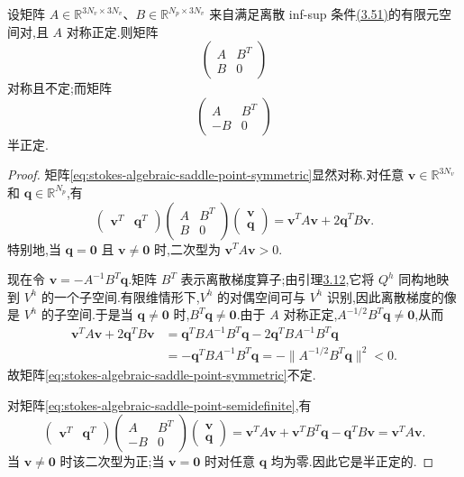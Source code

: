\begin{lemma}[鞍点矩阵的性质]\label{lem:stokes-algebraic-saddle-point-matrices}
设矩阵 $A\in\mathbb{R}^{3N_v\times3N_v}$、$B\in\mathbb{R}^{N_p\times3N_v}$ 来自满足离散 inf-sup 条件\hyperref[eq:discrete-infsup-condition]{(3.51)}的有限元空间对,且 $A$ 对称正定.则矩阵
\begin{equation}\label{eq:stokes-algebraic-saddle-point-symmetric}
  \begin{pmatrix}A&B^T\\B&0\end{pmatrix}
\end{equation}
对称且不定;而矩阵
\begin{equation}\label{eq:stokes-algebraic-saddle-point-semidefinite}
  \begin{pmatrix}A&B^T\\-B&0\end{pmatrix}
\end{equation}
半正定.
\end{lemma}
\begin{proof}
矩阵\cref{eq:stokes-algebraic-saddle-point-symmetric}显然对称.对任意 $\bm{v}\in\mathbb{R}^{3N_v}$ 和 $\bm{q}\in\mathbb{R}^{N_p}$,有
\[
  \begin{pmatrix}\bm{v}^T&\bm{q}^T\end{pmatrix}
  \begin{pmatrix}A&B^T\\B&0\end{pmatrix}
  \begin{pmatrix}\bm{v}\\\bm{q}\end{pmatrix}
  =\bm{v}^TA\bm{v}+2\bm{q}^TB\bm{v}.
\]
特别地,当 $\bm{q}=\bm{0}$ 且 $\bm{v}\ne\bm{0}$ 时,二次型为 $\bm{v}^TA\bm{v}>0$.

现在令 $\bm{v}=-A^{-1}B^T\bm{q}$.矩阵 $B^T$ 表示离散梯度算子;由引理\hyperref[lem:gradient-isomorphism]{3.12},它将 $Q^h$ 同构地映到 $V^h$ 的一个子空间.有限维情形下,$V^h$ 的对偶空间可与 $V^h$ 识别,因此离散梯度的像是 $V^h$ 的子空间.于是当 $\bm{q}\ne\bm{0}$ 时,$B^T\bm{q}\ne\bm{0}$.由于 $A$ 对称正定,$A^{-1/2}B^T\bm{q}\ne\bm{0}$,从而
\[
\begin{aligned}
  \bm{v}^TA\bm{v}+2\bm{q}^TB\bm{v}
  &=\bm{q}^TBA^{-1}B^T\bm{q}
       -2\bm{q}^TBA^{-1}B^T\bm{q}\\
  &=-\bm{q}^TBA^{-1}B^T\bm{q}
   =-\|A^{-1/2}B^T\bm{q}\|^2<0.
\end{aligned}
\]
故矩阵\cref{eq:stokes-algebraic-saddle-point-symmetric}不定.

对矩阵\cref{eq:stokes-algebraic-saddle-point-semidefinite},有
\[
  \begin{pmatrix}\bm{v}^T&\bm{q}^T\end{pmatrix}
  \begin{pmatrix}A&B^T\\-B&0\end{pmatrix}
  \begin{pmatrix}\bm{v}\\\bm{q}\end{pmatrix}
  =\bm{v}^TA\bm{v}+\bm{v}^TB^T\bm{q}-\bm{q}^TB\bm{v}
  =\bm{v}^TA\bm{v}.
\]
当 $\bm{v}\ne\bm{0}$ 时该二次型为正;当 $\bm{v}=\bm{0}$ 时对任意 $\bm{q}$ 均为零.因此它是半正定的.
\end{proof}

